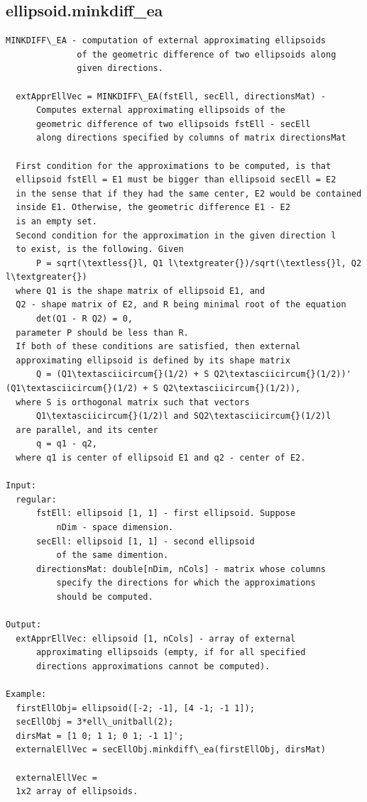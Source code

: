 \documentclass[letterpaper,10pt,english]{sphinxmanual}
\begin{document}
\subsection{ellipsoid.minkdiff\_ea}
\label{chap_functions:ellipsoid-minkdiff-ea}
\begin{Verbatim}[commandchars=\\\{\}]
MINKDIFF\_EA - computation of external approximating ellipsoids
              of the geometric difference of two ellipsoids along
              given directions.

  extApprEllVec = MINKDIFF\_EA(fstEll, secEll, directionsMat) -
      Computes external approximating ellipsoids of the
      geometric difference of two ellipsoids fstEll - secEll
      along directions specified by columns of matrix directionsMat

  First condition for the approximations to be computed, is that
  ellipsoid fstEll = E1 must be bigger than ellipsoid secEll = E2
  in the sense that if they had the same center, E2 would be contained
  inside E1. Otherwise, the geometric difference E1 - E2
  is an empty set.
  Second condition for the approximation in the given direction l
  to exist, is the following. Given
      P = sqrt(\textless{}l, Q1 l\textgreater{})/sqrt(\textless{}l, Q2 l\textgreater{})
  where Q1 is the shape matrix of ellipsoid E1, and
  Q2 - shape matrix of E2, and R being minimal root of the equation
      det(Q1 - R Q2) = 0,
  parameter P should be less than R.
  If both of these conditions are satisfied, then external
  approximating ellipsoid is defined by its shape matrix
      Q = (Q1\textasciicircum{}(1/2) + S Q2\textasciicircum{}(1/2))' (Q1\textasciicircum{}(1/2) + S Q2\textasciicircum{}(1/2)),
  where S is orthogonal matrix such that vectors
      Q1\textasciicircum{}(1/2)l and SQ2\textasciicircum{}(1/2)l
  are parallel, and its center
      q = q1 - q2,
  where q1 is center of ellipsoid E1 and q2 - center of E2.

Input:
  regular:
      fstEll: ellipsoid [1, 1] - first ellipsoid. Suppose
          nDim - space dimension.
      secEll: ellipsoid [1, 1] - second ellipsoid
          of the same dimention.
      directionsMat: double[nDim, nCols] - matrix whose columns
          specify the directions for which the approximations
          should be computed.

Output:
  extApprEllVec: ellipsoid [1, nCols] - array of external
      approximating ellipsoids (empty, if for all specified
      directions approximations cannot be computed).

Example:
  firstEllObj= ellipsoid([-2; -1], [4 -1; -1 1]);
  secEllObj = 3*ell\_unitball(2);
  dirsMat = [1 0; 1 1; 0 1; -1 1]';
  externalEllVec = secEllObj.minkdiff\_ea(firstEllObj, dirsMat)

  externalEllVec =
  1x2 array of ellipsoids.
\end{Verbatim}
\end{document}
